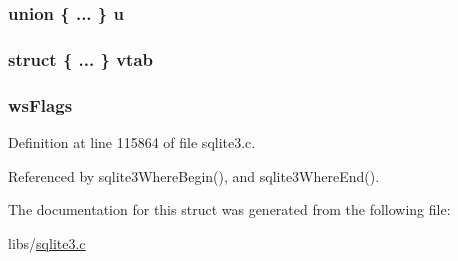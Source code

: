 \subsubsection[{u}]{\setlength{\rightskip}{0pt plus 5cm}union \{ ... \}   u}\label{struct_where_loop_a4b7109c9afc6317a714fc4748de1b95a}
\hypertarget{struct_where_loop_a28837ab871613ee4238d75c29ba0fb73}{}
\subsubsection[{vtab}]{\setlength{\rightskip}{0pt plus 5cm}struct \{ ... \}   vtab}\label{struct_where_loop_a28837ab871613ee4238d75c29ba0fb73}
\hypertarget{struct_where_loop_a105a3ce7af3fa19f43535221c8514754}{}
\subsubsection[{ws\+Flags}]{ ws\+Flags}\label{struct_where_loop_a105a3ce7af3fa19f43535221c8514754}


Definition at line 115864 of file sqlite3.\+c.



Referenced by sqlite3\+Where\+Begin(), and sqlite3\+Where\+End().



The documentation for this struct was generated from the following file\+:\begin{DoxyCompactItemize}
\item 
libs/\hyperlink{sqlite3_8c}{sqlite3.\+c}\end{DoxyCompactItemize}
